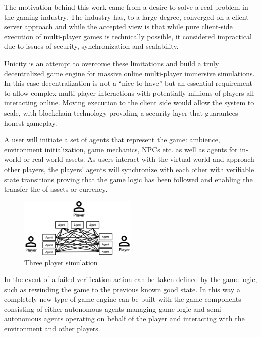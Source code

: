 \documentclass{article}
\begin{document}
\vspace{2mm} 
The motivation behind this work came from a desire to solve a real problem in the gaming industry. The industry has, to a large degree, converged on a client-server approach and while the accepted view is that while pure client-side execution of multi-player games is technically possible, it considered impractical due to issues of security, synchronization and scalability. 
\vspace{2mm}

Unicity is an attempt to overcome these limitations and build a truly decentralized game engine for massive online multi-player immersive simulations. In this case decentralization is not a “nice to have” but an essential requirement to allow complex multi-player interactions with potentially millions of players all interacting online. Moving execution to the client side would allow the system to scale, with blockchain technology providing a security layer that guarantees honest gameplay. 

\vspace{2mm}
A user will initiate a set of agents that represent the game: ambience, environment initialization, game mechanics, NPCs etc. as well as agents for in-world or real-world assets. As users interact with the virtual world and approach other players, the players' agents will synchronize with each other with verifiable state transitions proving that the game logic has been followed and enabling the transfer the of assets or currency. 

\begin{figure}[H]
    \centering
    \includegraphics[width=0.5\textwidth]{3Player.png}
    \caption{Three player simulation}
    \label{fig:Threeplayer}
\end{figure}

In the event of a failed verification action can be taken defined by the game logic, such as rewinding the game to the previous known good state. In this way a completely new type of game engine can be built with the game components consisting of either autonomous agents managing game logic and semi-autonomous agents operating on behalf of the player and interacting with the environment and other players.
\end{document}
